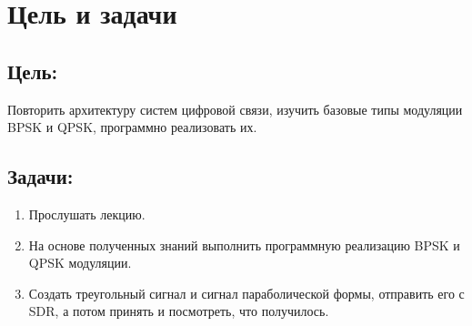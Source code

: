 \chapter{Цель и задачи}
\label{ch:intro}

\section*{\textbf{Цель:}}

Повторить архитектуру систем цифровой связи, изучить базовые типы модуляции BPSK и QPSK, программно реализовать их.

\section*{\textbf{Задачи:}}

\begin{enumerate}
    \item Прослушать лекцию.
    \item На основе полученных знаний выполнить программную реализацию BPSK и QPSK модуляции.
    \item Создать треугольный сигнал и сигнал параболической формы, отправить его с SDR, а потом принять и посмотреть, что получилось.
\end{enumerate}

\endinput
